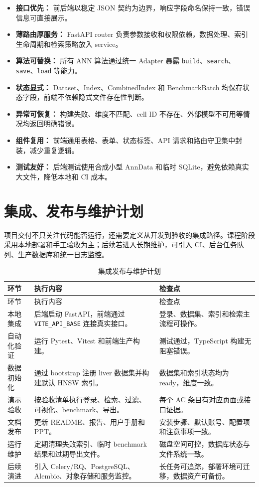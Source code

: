 \documentclass[UTF8,a4paper,12pt]{ctexrep}
\begin{document}
\begin{itemize}
  \item \textbf{接口优先：} 前后端以稳定 JSON 契约为边界，响应字段命名保持一致，错误信息可直接展示。
  \item \textbf{薄路由厚服务：} FastAPI router 负责参数接收和权限依赖，数据处理、索引生命周期和检索策略放入 service。
  \item \textbf{算法可替换：} 所有 ANN 算法通过统一 Adapter 暴露 \texttt{build}、\texttt{search}、\texttt{save}、\texttt{load} 等能力。
  \item \textbf{状态显式：} Dataset、Index、CombinedIndex 和 BenchmarkBatch 均保存状态字段，前端不依赖隐式文件存在性判断。
  \item \textbf{异常可恢复：} 构建失败、维度不匹配、cell ID 不存在、外部模型不可用等情况均返回明确错误。
  \item \textbf{组件复用：} 前端通用表格、表单、状态标签、API 请求和路由守卫集中封装，减少重复逻辑。
  \item \textbf{测试友好：} 后端测试使用合成小型 AnnData 和临时 SQLite，避免依赖真实大文件，降低本地和 CI 成本。
\end{itemize}

\section{集成、发布与维护计划}

项目交付不只关注代码能否运行，还需要定义从开发到验收的集成路径。课程阶段采用本地部署和手工验收为主；后续若进入长期维护，可引入 CI、后台任务队列、生产数据库和统一日志监控。

\begin{longtable}{@{}L{0.18\textwidth}L{0.40\textwidth}L{0.32\textwidth}@{}}
  \caption{集成发布与维护计划} \\
  \toprule
  环节 & 执行内容 & 检查点 \\
  \midrule
  \endfirsthead
  \toprule
  环节 & 执行内容 & 检查点 \\
  \midrule
  \endhead
  本地集成 & 后端启动 FastAPI，前端通过 \texttt{VITE\_API\_BASE} 连接真实接口。 & 登录、数据集、索引和检索主流程可操作。 \\
  自动化验证 & 运行 Pytest、Vitest 和前端生产构建。 & 测试通过，TypeScript 构建无阻塞错误。 \\
  数据初始化 & 通过 bootstrap 注册 liver 数据集并构建默认 HNSW 索引。 & 数据集和索引状态均为 ready，维度一致。 \\
  演示验收 & 按验收清单执行登录、检索、过滤、可视化、benchmark、导出。 & 每个 AC 条目有对应页面或接口证据。 \\
  文档发布 & 更新 README、报告、用户手册和 PPT。 & 安装步骤、默认账号、配置项和注意事项一致。 \\
  运行维护 & 定期清理失败索引、临时 benchmark 结果和过期导出文件。 & 磁盘空间可控，数据库状态与文件系统一致。 \\
  后续演进 & 引入 Celery/RQ、PostgreSQL、Alembic、对象存储和服务监控。 & 长任务可追踪，部署环境可迁移，数据资产可备份。 \\
  \bottomrule
\end{longtable}
\end{document}
